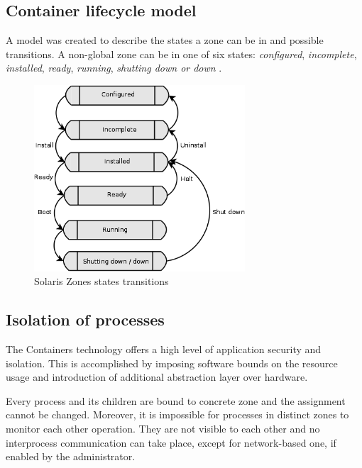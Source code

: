 \documentclass[11pt]{book}
\begin{document}
      \subsection{Container lifecycle model}
      \label{sub:}

        A model was created to describe the states a zone can be in and possible transitions. A non-global zone can be in one of six states:
        \textit{configured}, \textit{incomplete}, \textit{installed}, \textit{ready}, \textit{running}, \textit{shutting
        down or down} \cite{sag}.

        \begin{figure}[H]
          \begin{center}
            \includegraphics[width=0.7\textwidth]{img/solaris/zone_states.png}
          \end{center}

          \caption{Solaris Zones states transitions}
        \end{figure}


      \subsection{Isolation of processes}
      \label{sub:}

        The Containers technology offers a high level of application security and isolation. This is accomplished by
        imposing software bounds on the resource usage and introduction of additional abstraction layer over hardware.

        Every process and its children are bound to concrete zone and the assignment cannot be changed. Moreover, it is
        impossible for processes in distinct zones to monitor each other operation. They are not visible to each other
        and no interprocess communication can take place, except for network-based one, if enabled by the administrator.
\end{document}
